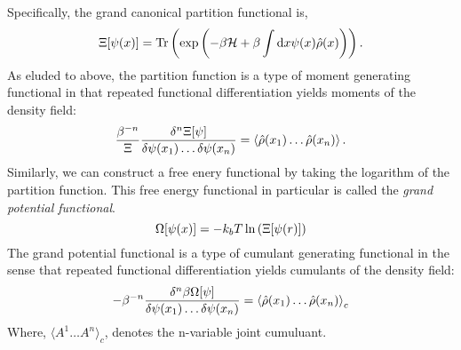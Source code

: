 Specifically, the grand canonical partition functional is,
%
\begin{equation}
    \Xi[\psi(x)] = \mathrm{Tr}\left( \exp\left(-\beta\mathcal{H} +\beta\int\mathrm{d}x \psi(x) \hat{\rho}(x)\right) \right).
\end{equation}
%
As eluded to above, the partition function is a type of moment generating functional in that repeated functional differentiation yields moments of the density field:
%
\begin{equation}
   \frac{\beta^{-n}}{\Xi} \frac{\delta^n \Xi[\psi]}{\delta \psi(x_1) \dots \delta\psi(x_n)} = \left\langle \hat{\rho}(x_1)\dots\hat{\rho}(x_n) \right\rangle.
\end{equation}
%
Similarly, we can construct a free enery functional by taking the logarithm of the partition function. This free energy functional in particular is called the \textit{grand potential functional}.
%
\begin{equation}
    \Omega[\psi(x)] = -k_bT\ln\left(\Xi[\psi(r)]\right)
\end{equation}
%
The grand potential functional is a type of cumulant generating functional in the sense that repeated functional differentiation yields cumulants of the density field:
%
\begin{equation}
    -\beta^{-n}\frac{\delta^n \beta\Omega[\psi]}{\delta\psi(x_1)\dots\delta\psi(x_n)} = \left\langle \hat{\rho}(x_1)\dots\hat{\rho}(x_n) \right\rangle_c
\end{equation}
%
Where, $\langle A^1\dots A^n \rangle_c$, denotes the n-variable joint cumuluant.

